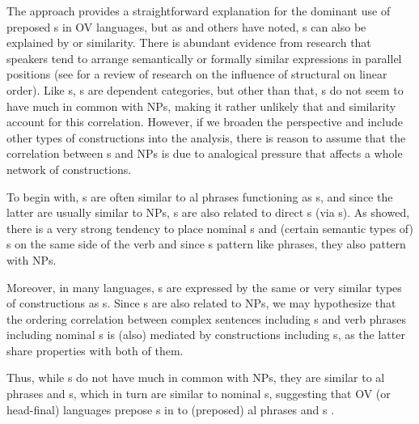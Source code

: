 \documentclass[output=paper]{langsci/langscibook}
\begin{document}
The  approach provides a straightforward explanation for the dominant use of preposed s in OV languages, but as \citet{Krifka1985} and others have noted, s can also be explained by  or similarity. There is abundant evidence from  research that speakers tend to arrange semantically or formally similar expressions in parallel positions (see \citealt{PickeringFerreira2008} for a review of  research on the influence of structural  on linear order). Like s, s are dependent categories, but other than that, s do not seem to have much in common with  NPs, making it rather unlikely that  and similarity account for this correlation. However, if we broaden the perspective and include other types of constructions into the analysis, there is reason to assume that the correlation between s and  NPs is due to analogical pressure that affects a whole network of constructions.

To begin with, s are often similar to al phrases functioning as s, and since the latter are usually similar to  NPs, s are also related to direct s (via s). As \citet{Dryer1992} showed, there is a very strong tendency to place nominal s and (certain semantic types of) s on the same side of the verb and since s pattern like  phrases, they also pattern with  NPs. 

Moreover, in many languages, s are expressed by the same or very similar types of constructions as s. Since s are also related to  NPs, we may hypothesize that the ordering correlation between complex sentences including s and verb phrases including nominal s is (also) mediated by constructions including s, as the latter share properties with both of them.

Thus, while s do not have much in common with  NPs, they are similar to al phrases and s, which in turn are similar to nominal s, suggesting that OV (or head-final) languages prepose s in  to (preposed) al phrases and s .
\end{document}
